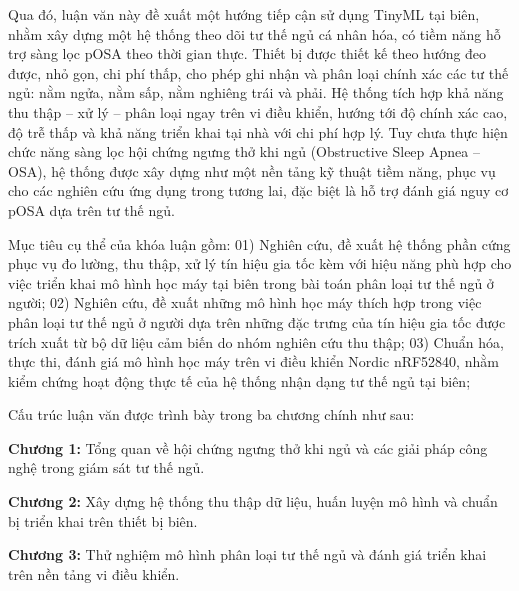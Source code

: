 Qua đó, luận văn này đề xuất một hướng tiếp cận sử dụng TinyML tại biên, nhằm
xây dựng một hệ thống theo dõi tư thế ngủ cá nhân hóa, có tiềm năng hỗ trợ sàng
lọc pOSA theo thời gian thực. Thiết bị được thiết kế theo hướng đeo được, nhỏ
gọn, chi phí thấp, cho phép ghi nhận và phân loại chính xác các tư thế ngủ: nằm
ngửa, nằm sấp, nằm nghiêng trái và phải. Hệ thống tích hợp khả năng thu thập –
xử lý – phân loại ngay trên vi điều khiển, hướng tới độ chính xác cao, độ trễ
thấp và khả năng triển khai tại nhà với chi phí hợp lý. Tuy chưa thực hiện chức
năng sàng lọc hội chứng ngưng thở khi ngủ (Obstructive Sleep Apnea – OSA), hệ
thống được xây dựng như một nền tảng kỹ thuật tiềm năng, phục vụ cho các nghiên
cứu ứng dụng trong tương lai, đặc biệt là hỗ trợ đánh giá nguy cơ pOSA dựa trên
tư thế ngủ.

Mục tiêu cụ thể của khóa luận gồm: 01) Nghiên cứu, đề xuất hệ thống phần cứng
phục vụ đo lường, thu thập, xử lý tín hiệu gia tốc kèm với hiệu năng phù hợp
cho việc triển khai mô hình học máy tại biên trong bài toán phân loại tư thế
ngủ ở người; 02) Nghiên cứu, đề xuất những mô hình học máy thích hợp trong việc
phân loại tư thế ngủ ở người dựa trên những đặc trưng của tín hiệu gia tốc được
trích xuất từ bộ dữ liệu cảm biến do nhóm nghiên cứu thu thập; 03) Chuẩn hóa,
thực thi, đánh giá mô hình học máy trên vi điều khiển Nordic nRF52840, nhằm
kiểm chứng hoạt động thực tế của hệ thống nhận dạng tư thế ngủ tại biên;

Cấu trúc luận văn được trình bày trong ba chương chính như sau:

\noindent\textbf{Chương 1:} Tổng quan về hội chứng ngưng thở khi ngủ và các giải pháp công nghệ trong giám sát tư thế ngủ.

\noindent\textbf{Chương 2:} Xây dựng hệ thống thu thập dữ liệu, huấn luyện mô hình và chuẩn bị triển khai trên thiết bị biên.

\noindent\textbf{Chương 3:} Thử nghiệm mô hình phân loại tư thế ngủ và đánh giá triển khai trên nền tảng vi điều khiển.
